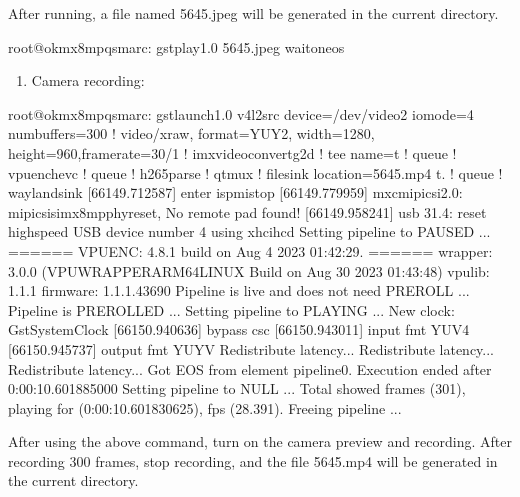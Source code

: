 \documentclass[letterpaper,10pt,openany,english]{sphinxmanual}
\begin{document}
\sphinxAtStartPar
After running, a file named 5645.jpeg will be generated in the current directory.

\begin{sphinxVerbatim}[commandchars=\\\{\}]
root@ok\PYGZhy{}mx8mpq\PYGZhy{}smarc:\PYGZti{}\PYGZsh{} gst\PYGZhy{}play\PYGZhy{}1.0 5645.jpeg \PYGZhy{}\PYGZhy{}wait\PYGZhy{}on\PYGZhy{}eos
\end{sphinxVerbatim}
\begin{enumerate}
%
\setcounter{enumi}{2}
\item {} 
\sphinxAtStartPar
Camera recording:

\end{enumerate}

\begin{sphinxVerbatim}[commandchars=\\\{\}]
root@ok\PYGZhy{}mx8mpq\PYGZhy{}smarc:\PYGZti{}\PYGZsh{} gst\PYGZhy{}launch\PYGZhy{}1.0 v4l2src device=/dev/video2 io\PYGZhy{}mode=4 num\PYGZhy{}buffers=300 ! video/x\PYGZhy{}raw, format=YUY2, width=1280, height=960,framerate=30/1 ! imxvideoconvert\PYGZus{}g2d ! tee name=t ! queue ! vpuenc\PYGZus{}hevc ! queue ! h265parse ! qtmux ! filesink location=5645.mp4 t. ! queue ! waylandsink
[66149.712587] enter isp\PYGZus{}mi\PYGZus{}stop
[66149.779959] mxc\PYGZhy{}mipi\PYGZhy{}csi2.0: mipi\PYGZus{}csis\PYGZus{}imx8mp\PYGZus{}phy\PYGZus{}reset, No remote pad found!
[66149.958241] usb 3\PYGZhy{}1.4: reset high\PYGZhy{}speed USB device number 4 using xhci\PYGZhy{}hcd
Setting pipeline to PAUSED ...
====== VPUENC: 4.8.1 build on Aug  4 2023 01:42:29. ======
        wrapper: 3.0.0 (VPUWRAPPER\PYGZus{}ARM64\PYGZus{}LINUX Build on Aug 30 2023 01:43:48)
        vpulib: 1.1.1
        firmware: 1.1.1.43690
Pipeline is live and does not need PREROLL ...
Pipeline is PREROLLED ...
Setting pipeline to PLAYING ...
New clock: GstSystemClock
[66150.940636] bypass csc
[66150.943011] input fmt YUV4
[66150.945737] output fmt YUYV
Redistribute latency...
Redistribute latency...
Redistribute latency...
Got EOS from element \PYGZdq{}pipeline0\PYGZdq{}.
Execution ended after 0:00:10.601885000
Setting pipeline to NULL ...
Total showed frames (301), playing for (0:00:10.601830625), fps (28.391).
Freeing pipeline ...
\end{sphinxVerbatim}

\sphinxAtStartPar
After using the above command, turn on the camera preview and recording. After recording 300 frames, stop recording, and the file 5645.mp4 will be generated in the current directory.
\end{document}
